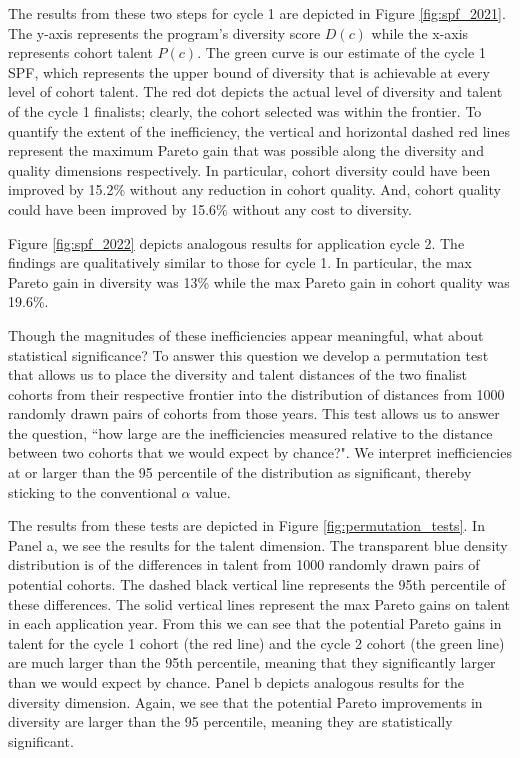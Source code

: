 The results from these two steps for cycle 1 are depicted in Figure \ref{fig:spf_2021}. The y-axis represents the program's diversity score $D(c)$ while the x-axis represents cohort talent $P(c)$. The green curve is our estimate of the cycle 1 SPF, which represents the upper bound of diversity that is achievable at every level of cohort talent. The red dot depicts the actual level of diversity and talent of the cycle 1 finalists; clearly, the cohort selected was within the frontier. To quantify the extent of the inefficiency, the vertical and horizontal dashed red lines represent the maximum Pareto gain that was possible along the diversity and quality dimensions respectively. In particular, cohort diversity could have been improved by 15.2\% without any reduction in cohort quality. And, cohort quality could have been improved by 15.6\% without any cost to diversity. 

Figure \ref{fig:spf_2022} depicts analogous results for application cycle 2. The findings are qualitatively similar to those for cycle 1. In particular, the max Pareto gain in diversity was 13\% while the max Pareto gain in cohort quality was 19.6\%.

Though the magnitudes of these inefficiencies appear meaningful, what about statistical significance? To answer this question we develop a permutation test that allows us to place the diversity and talent distances of the two finalist cohorts from their respective frontier into the distribution of distances from 1000 randomly drawn pairs of cohorts from those years. This test allows us to answer the question, ``how large are the inefficiencies measured relative to the distance between two cohorts that we would expect by chance?". We interpret inefficiencies at or larger than the 95 percentile of the distribution as significant, thereby sticking to the conventional $\alpha$ value. 

The results from these tests are depicted in Figure \ref{fig:permutation_tests}. In Panel a, we see the results for the talent dimension. The transparent blue density distribution is of the differences in talent from 1000 randomly drawn pairs of potential cohorts. The dashed black vertical line represents the 95th percentile of these differences. The solid vertical lines represent the max Pareto gains on talent in each application year. From this we can see that the potential Pareto gains in talent for the cycle 1 cohort (the red line) and the cycle 2 cohort (the green line) are much larger than the 95th percentile, meaning that they significantly larger than we would expect by chance. Panel b depicts analogous results for the diversity dimension. Again, we see that the potential Pareto improvements in diversity are larger than the 95 percentile, meaning they are statistically significant. 

